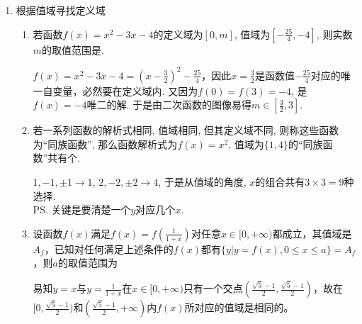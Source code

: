 \begin{enumerate}
\begin{enumerate}
        \begin{jieda}
            本质上还是在考察定义域.
        \end{jieda}
        \item 函数$y=\sqrt{\log_{\frac{1}{3}}\left(\log_{\frac{1}{3}}\left(\log_{\frac{1}{3}}x\right)\right)}$的定义域是\blkda{$\left(\frac{1}{3},\sqrt[3]{\frac{1}{3}}\right]$}.
        \begin{jieda}
        $\log_{\frac{1}{3}}\left(\log_{\frac{1}{3}}\left(\log_{\frac{1}{3}}x\right)\right)\geq 0\iff 0<\log_{\frac{1}{3}}\left(\log_{\frac{1}{3}}x\right)\leq 1
        \iff 1>\log_{\frac{1}{3}}x\geq\frac{1}{3}\iff (\frac{1}{3})^1<x\leq(\frac{1}{3})^{\frac{1}{3}}$. 
        \end{jieda}
    \end{enumerate}
    \item 根据值域寻找定义域
    \begin{enumerate}
        \item 若函数$f(x)=x^2-3x-4$的定义域为$[0,m]$, 值域为$\left[-\frac{25}{4},-4\right]$, 则实数$m$的取值范围是\blkda{$[\frac{3}{2},3]$}. 
        \begin{jieda}
        $f(x)=x^2-3x-4=(x-\frac{3}{2})^2-\frac{25}{4}$，因此$x = \frac{3}{2}$是函数值$-\frac{25}{4}$对应的唯一自变量，必然要在定义域内. 又因为$f(0)=f(3)=-4$, 是$f(x)=-4$唯二的解. 于是由二次函数的图像易得$m\in[\frac{3}{2},3]$. 
        \end{jieda}
        \item 若一系列函数的解析式相同, 值域相同, 但其定义域不同, 则称这些函数为``同族函数'', 
        那么函数解析式为$f(x)=x^2$, 值域为$\{1,4\}$的``同族函数''共有个.
        \begin{jieda}
        $1,-1,\pm1\to 1$, $2,-2,\pm2\to 4$, 于是从值域的角度, $x$的组合共有$3\times3=9$种选择. \\
        \ps 关键是要清楚一个$y$对应几个$x$.
        \end{jieda} 
        \item 设函数$f(x)$满足$f(x) = f(\frac{1}{1+x})$对任意$x \in [0, +\infty)$都成立，其值域是$A_f$，已知对任何满足上述条件的$f(x)$都有$\{y| y = f(x), 0 \leq x \leq a \} = A_f$，则$a$的取值范围为 \blkda[2]{$[\frac{\sqrt{5}-1}{2}, +\infty)$}
        \begin{jieda}
            易知$y = x$与$y = \frac{1}{1+x}$在$x \in [0, +\infty)$只有一个交点$(\frac{\sqrt{5}-1}{2}, \frac{\sqrt{5}-1}{2})$，故在$[0,\frac{\sqrt{5}-1}{2})$和$(\frac{\sqrt{5}-1}{2}, +\infty)$内$f(x)$所对应的值域是相同的。\\

\end{jieda}
\end{enumerate}
\end{enumerate}
